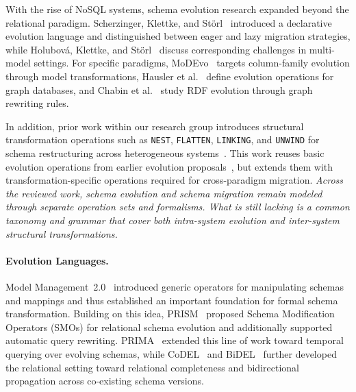 \documentclass{llncs}
\begin{document}
With the rise of NoSQL systems, schema evolution research expanded beyond the relational paradigm. Scherzinger, Klettke, and St\"orl~\cite{scherzinger2013managing} introduced a declarative evolution language and distinguished between eager and lazy migration strategies, while Holubov\'a, Klettke, and St\"orl~\cite{holubova2019evolution} discuss corresponding challenges in multi-model settings. For specific paradigms, MoDEvo~\cite{suarez2025data} targets column-family evolution through model transformations, Hausler et al.~\cite{hausler2023language} define evolution operations for graph databases, and Chabin et al.~\cite{DBLP:journals/ijwis/ChabinEFH21} study RDF evolution through graph rewriting rules.

In addition, prior work within our research group introduces structural transformation operations such as \texttt{NEST}, \texttt{FLATTEN}, \texttt{LINKING}, and \texttt{UNWIND} for schema restructuring across heterogeneous systems~\cite{meier2023datenmigration}. This work reuses basic evolution operations from earlier evolution proposals~\cite{scherzinger2013managing,holubova2019evolution}, but extends them with transformation-specific operations required for cross-paradigm migration. \textit{Across the reviewed work, schema evolution and schema migration remain modeled through separate operation sets and formalisms. What is still lacking is a common taxonomy and grammar that cover both intra-system evolution and inter-system structural transformations.}

\paragraph{Evolution Languages.}
Model Management~2.0~\cite{bernstein2007model} introduced generic operators for manipulating schemas and mappings and thus established an important foundation for formal schema transformation. Building on this idea, PRISM~\cite{curino2008graceful} proposed Schema Modification Operators (SMOs) for relational schema evolution and additionally supported automatic query rewriting. PRIMA~\cite{moon2009prima} extended this line of work toward temporal querying over evolving schemas, while CoDEL~\cite{herrmann2015codel} and BiDEL~\cite{herrmann2017living} further developed the relational setting toward relational completeness and bidirectional propagation across co-existing schema versions.
\end{document}
